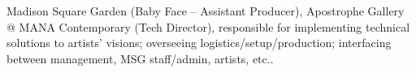 \documentclass[]{deedy-resume-openfont}
\begin{document}
\begin{minipage}[t]{0.58\textwidth}
 \newline

\vspace{\topsep} %
Madison Square Garden (Baby Face – Assistant Producer), Apostrophe Gallery @ MANA Contemporary (Tech Director), responsible for implementing technical solutions to artists’ visions; overseeing logistics/setup/production; interfacing between management, MSG staff/admin, artists, etc..
\sectionseplg
\sectionseplg
\begin{flushright} 
    \scalebox{0.65}{(last compiled \today)} 
\end{flushright}

\end{minipage}
\end{document}
